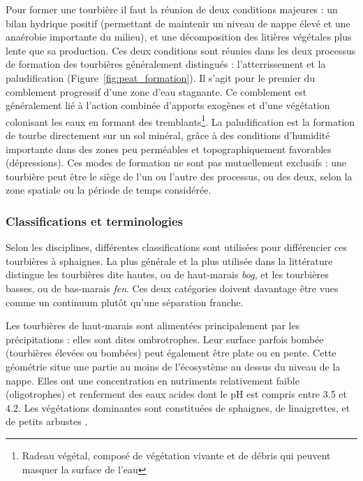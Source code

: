 Pour former une tourbière il faut la réunion de deux conditions majeures : un bilan hydrique positif (permettant de maintenir un niveau de nappe élevé et une anaérobie importante du milieu), et une décomposition des litières végétales plus lente que sa production.
Ces deux conditions sont réunies dans les deux processus de formation des tourbières généralement distingués : l'atterrissement et la paludification (Figure~\ref{fig:peat_formation}).
Il s'agit pour le premier du comblement progressif d'une zone d'eau stagnante.
Ce comblement est généralement lié à l'action combinée d'apports exogènes et d'une végétation colonisant les eaux en formant des tremblants\footnote{Radeau végétal, composé de végétation vivante et de débris qui peuvent masquer la surface de l'eau}.
La paludification est la formation de tourbe directement sur un sol minéral, grâce à des conditions d'humidité importante dans des zones peu perméables et topographiquement favorables (dépressions).
Ces modes de formation ne sont pas mutuellement exclusifs : une tourbière peut être le siège de l'un ou l'autre des processus, ou des deux, selon la zone spatiale ou la période de temps considérée.

\subsubsection{Classifications et terminologies}
%


Selon les disciplines, différentes classifications sont utilisées pour différencier ces tourbières à sphaignes.
La plus générale et la plus utilisée dans la littérature distingue les tourbières dite hautes, ou de haut-marais \textit{bog}, et les tourbières basses, ou de bas-marais \textit{fen}.
Ces deux catégories doivent davantage être vues comme un continuum plutôt qu'une séparation franche.

Les tourbières de haut-marais sont alimentées principalement par les précipitations : elles sont dites ombrotrophes.
Leur surface parfois bombée (tourbières élevées ou bombées) peut également être plate ou en pente.
Cette géométrie situe une partie au moins de l'écosystème au dessus du niveau de la nappe.
Elles ont une concentration en nutriments relativement faible (oligotrophes) et renferment des eaux acides dont le pH est compris entre \num{3.5} et \num{4.2}.
Les végétations dominantes sont constituées de sphaignes, de linaigrettes, et de petits arbustes  \citep{francez2000,rydin2013a}.

